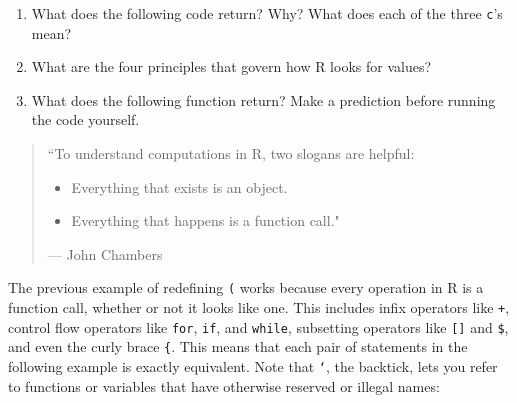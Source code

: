 \begin{enumerate}
\def\labelenumi{\arabic{enumi}.}
\item
  What does the following code return? Why? What does each of the three
  \texttt{c}'s mean?

\begin{Shaded}
\begin{Highlighting}[]
\StringTok{ }
\NormalTok{(} 
\end{Highlighting}
\end{Shaded}
\item
  What are the four principles that govern how R looks for values?
\item
  What does the following function return? Make a prediction before
  running the code yourself.

\begin{Shaded}
\begin{Highlighting}[]
\StringTok{ }
  \StringTok{ }
    \StringTok{ }
      \StringTok{ }
    \NormalTok{\}}
    \StringTok{ }
  \NormalTok{\}}
  \StringTok{ }
\NormalTok{\}}
\NormalTok{(}\NormalTok{)}
\end{Highlighting}
\end{Shaded}
\end{enumerate}


\begin{quote}
``To understand computations in R, two slogans are helpful:

\begin{itemize}
\itemsep1pt\parskip0pt
\item
  Everything that exists is an object.
\item
  Everything that happens is a function call."
\end{itemize}

--- John Chambers
\end{quote}

The previous example of redefining \texttt{(} works because every
operation in R is a function call, whether or not it looks like one.
This includes infix operators like \texttt{+}, control flow operators
like \texttt{for}, \texttt{if}, and \texttt{while}, subsetting operators
like \texttt{{[}{]}} and \texttt{\$}, and even the curly brace
\texttt{\{}. This means that each pair of statements in the following
example is exactly equivalent. Note that \texttt{`}, the backtick, lets
you refer to functions or variables that have otherwise reserved or
illegal names:  

